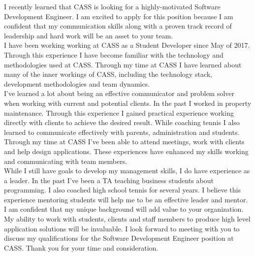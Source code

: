 \documentclass[11pt, a4paper]{awesome-cv}
\begin{document}
\makecvheader

\makelettertitle

\begin{cvletter}
    I recently learned that CASS is looking for a highly-motivated Software Development Engineer. I am excited to apply for this position because I am confident that my communication skills along with a proven track record of leadership and hard work will be an asset to your team.\\
    
   I have been working working at CASS as a Student Developer since May of 2017. Through this experience I have become familiar with the technology and methodologies used at CASS. Through my time at CASS I have learned about many of the inner workings of CASS, including the technology stack, development methodologies and team dynamics.\\
    
   I've learned a lot about being an effective communicator and problem solver when working with current and potential clients. In the past I worked in property maintenance. Through this experience I gained practical experience working directly with clients to achieve the desired result. While coaching tennis I also learned to communicate effectively with parents, administration and students. Through my time at CASS I've been able to attend meetings, work with clients and help design applications. These experiences have enhanced my skills working and communicating with team members. \\
    
    While I still have goals to develop my management skills, I do have experience as a leader. In the past I've been a TA teaching business students about programming. I also coached high school tennis for several years. I believe this experience mentoring students will help me to be an effective leader and mentor.\\
    
    I am confident that my unique background will add value to your organization. My ability to work with students, clients and staff members to produce high level application solutions will be invaluable. I look forward to meeting with you to discuss my qualifications for the Software Development Engineer position at CASS. Thank you for your time and consideration.\\

\end{cvletter}

\makeletterclosing
\end{document}
